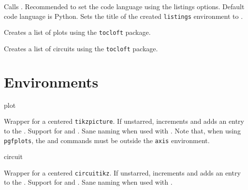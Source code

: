\documentclass{l3doc}
\begin{document}
\begin{function}{}
  \begin{syntax}
  \end{syntax}
  Calls . Recommended to set the code language using the listings options. Default code language is Python. Sets the title of the created \texttt{listings} environment to .
\end{function}

\begin{function}{\listofplots}
  Creates a list of plots using the \verb|tocloft| package.
\end{function}

\begin{function}{\listofcircuits}
  Creates a list of circuits using the \verb|tocloft| package.
\end{function}


\section{Environments}
\begin{function}{plot}
  \begin{syntax}
  \end{syntax}
  Wrapper for a centered \verb|tikzpicture|. If unstarred, increments  and adds an entry to the . Support for  and . Sane naming when used with . Note that, when using \verb|pgfplots|, the  and  commands must be outside the \verb|axis| environment.
\end{function}

\begin{function}{circuit}
  \begin{syntax}
  \end{syntax}
  Wrapper for a centered \verb|circuitikz|. If unstarred, increments  and adds an entry to the . Support for  and . Sane naming when used with .
\end{function}
\end{document}
